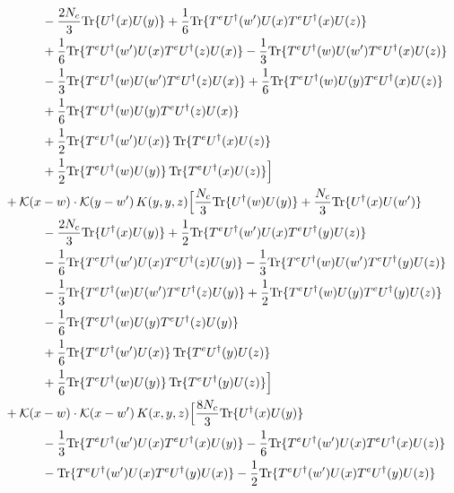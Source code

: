\documentclass[10pt]{article}
\numberwithin{equation}{section}
\begin{document}
\begin{align}
&\quad\quad\quad-\frac{2 N_c}{3}{\rm Tr}\{U^\dagger(x)U(y)\}+\frac{1}{6}{\rm Tr}\{T^eU^\dagger(w')U(x)T^eU^\dagger(x)U(z)\}\notag\\
&\quad\quad\quad+\frac{1}{6}{\rm Tr}\{T^eU^\dagger(w')U(x)T^eU^\dagger(z)U(x)\}-\frac{1}{3}{\rm Tr}\{T^eU^\dagger(w)U(w')T^eU^\dagger(x)U(z)\}\notag\\
&\quad\quad\quad-\frac{1}{3}{\rm Tr}\{T^eU^\dagger(w)U(w')T^eU^\dagger(z)U(x)\}+\frac{1}{6}{\rm Tr}\{T^eU^\dagger(w)U(y)T^eU^\dagger(x)U(z)\}\notag\\
&\quad\quad\quad+\frac{1}{6}{\rm Tr}\{T^eU^\dagger(w)U(y)T^eU^\dagger(z)U(x)\}\notag\\
&\quad\quad\quad+\frac{1}{2}{\rm Tr}\{T^eU^\dagger(w')U(x)\}\,{\rm Tr}\{T^eU^\dagger(x)U(z)\}\notag\\
&\quad\quad\quad+\frac{1}{2}{\rm Tr}\{T^eU^\dagger(w)U(y)\}\,{\rm Tr}\{T^eU^\dagger(x)U(z)\}\Big]\notag\\
&+\mathcal K(x-w)\cdot\mathcal K(y-w')\,K(y,y,z)\Big[\frac{N_c}{3}{\rm Tr}\{U^\dagger(w)U(y)\}+\frac{N_c}{3}{\rm Tr}\{U^\dagger(x)U(w')\}\notag\\
&\quad\quad\quad-\frac{2 N_c}{3}{\rm Tr}\{U^\dagger(x)U(y)\}+\frac{1}{2}{\rm Tr}\{T^eU^\dagger(w')U(x)T^eU^\dagger(y)U(z)\}\notag\\
&\quad\quad\quad-\frac{1}{6}{\rm Tr}\{T^eU^\dagger(w')U(x)T^eU^\dagger(z)U(y)\}-\frac{1}{3}{\rm Tr}\{T^eU^\dagger(w)U(w')T^eU^\dagger(y)U(z)\}\notag\\
&\quad\quad\quad-\frac{1}{3}{\rm Tr}\{T^eU^\dagger(w)U(w')T^eU^\dagger(z)U(y)\}+\frac{1}{2}{\rm Tr}\{T^eU^\dagger(w)U(y)T^eU^\dagger(y)U(z)\}\notag\\
&\quad\quad\quad-\frac{1}{6}{\rm Tr}\{T^eU^\dagger(w)U(y)T^eU^\dagger(z)U(y)\}\notag\\
&\quad\quad\quad+\frac{1}{6}{\rm Tr}\{T^eU^\dagger(w')U(x)\}\,{\rm Tr}\{T^eU^\dagger(y)U(z)\}\notag\\
&\quad\quad\quad+\frac{1}{6}{\rm Tr}\{T^eU^\dagger(w)U(y)\}\,{\rm Tr}\{T^eU^\dagger(y)U(z)\}\Big]\notag\\
&+\mathcal K(x-w)\cdot\mathcal K(x-w')\,K(x,y,z)\Big[\frac{8 N_c}{3}{\rm Tr}\{U^\dagger(x)U(y)\}\notag\\
&\quad\quad\quad-\frac{1}{3}{\rm Tr}\{T^eU^\dagger(w')U(x)T^eU^\dagger(x)U(y)\}-\frac{1}{6}{\rm Tr}\{T^eU^\dagger(w')U(x)T^eU^\dagger(x)U(z)\}\notag\\
&\quad\quad\quad-{\rm Tr}\{T^eU^\dagger(w')U(x)T^eU^\dagger(y)U(x)\}-\frac{1}{2}{\rm Tr}\{T^eU^\dagger(w')U(x)T^eU^\dagger(y)U(z)\}\notag\\

\end{align}
\end{document}
